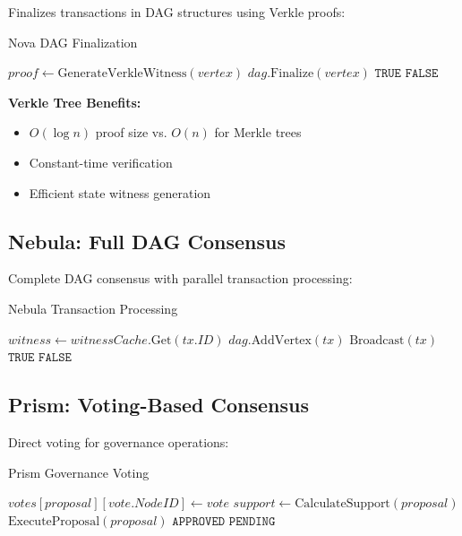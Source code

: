 \documentclass[11pt]{article}
\begin{document}
Finalizes transactions in DAG structures using Verkle proofs:

\begin{algorithm}[H]
\caption{Nova DAG Finalization}
\begin{algorithmic}[1]
    \State $proof \gets \text{GenerateVerkleWitness}(vertex)$
        \State $dag.\text{Finalize}(vertex)$
        \State \Return $\texttt{TRUE}$
    \EndIf
    \State \Return $\texttt{FALSE}$
\EndFunction
\end{algorithmic}
\end{algorithm}

\textbf{Verkle Tree Benefits:}
\begin{itemize}
\item $O(\log n)$ proof size vs. $O(n)$ for Merkle trees
\item Constant-time verification
\item Efficient state witness generation
\end{itemize}

\subsection{Nebula: Full DAG Consensus}

Complete DAG consensus with parallel transaction processing:

\begin{algorithm}[H]
\caption{Nebula Transaction Processing}
\begin{algorithmic}[1]
    \State $witness \gets witnessCache.\text{Get}(tx.ID)$
        \State $dag.\text{AddVertex}(tx)$
        \State $\text{Broadcast}(tx)$ 
        \State \Return $\texttt{TRUE}$
    \EndIf
    \State \Return $\texttt{FALSE}$
\EndFunction
\end{algorithmic}
\end{algorithm}

\subsection{Prism: Voting-Based Consensus}

Direct voting for governance operations:

\begin{algorithm}[H]
\caption{Prism Governance Voting}
\begin{algorithmic}[1]
    \State $votes[proposal][vote.NodeID] \gets vote$
    \State $support \gets \text{CalculateSupport}(proposal)$
        \State $\text{ExecuteProposal}(proposal)$
        \State \Return $\texttt{APPROVED}$
    \EndIf
    \State \Return $\texttt{PENDING}$
\EndFunction
\end{algorithmic}
\end{algorithm}
\end{document}
